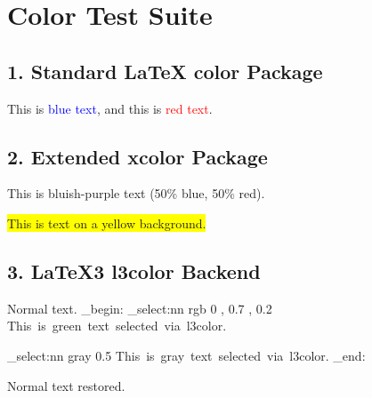 \documentclass{article}
\begin{document}
\section*{Color Test Suite}

\subsection*{1. Standard LaTeX color Package}
This is \textcolor{blue}{blue text}, and this is \textcolor{red}{red text}.

\subsection*{2. Extended xcolor Package}
This is \textcolor{blue!50!red}{bluish-purple text (50\% blue, 50\% red)}.

\colorbox{yellow}{This is text on a yellow background.}

\subsection*{3. LaTeX3 l3color Backend}
Normal text.
\ExplSyntaxOn
\group_begin:
\color_select:nn { rgb } { 0 , 0.7 , 0.2 }
This~is~green~text~selected~via~l3color.
\par
\color_select:nn { gray } { 0.5 }
This~is~gray~text~selected~via~l3color.
\group_end:
\ExplSyntaxOff

Normal text restored.
\end{document}
